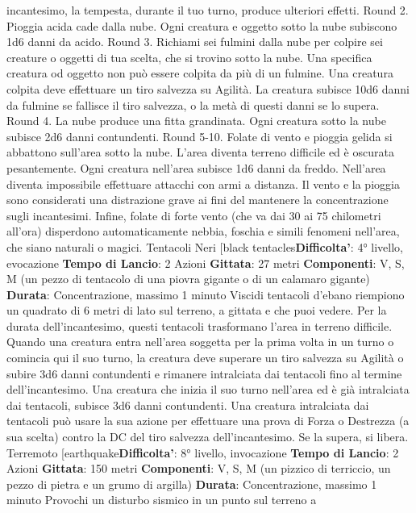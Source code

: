 \begin{multicols}{2}
incantesimo, la tempesta, durante il tuo turno, produce
ulteriori effetti.
Round 2. Pioggia acida cade dalla nube. Ogni creatura
e oggetto sotto la nube subiscono 1d6 danni da acido.
Round 3. Richiami sei fulmini dalla nube per colpire sei
creature o oggetti di tua scelta, che si trovino sotto la
nube. Una specifica creatura od oggetto non può
essere colpita da più di un fulmine. Una creatura colpita
deve effettuare un tiro salvezza su Agilità. La
creatura subisce 10d6 danni da fulmine se fallisce il tiro
salvezza, o la metà di questi danni se lo supera.
Round 4. La nube produce una fitta grandinata. Ogni
creatura sotto la nube subisce 2d6 danni contundenti.
Round 5-10. Folate di vento e pioggia gelida si
abbattono sull’area sotto la nube. L’area diventa terreno
difficile ed è oscurata pesantemente. Ogni creatura
nell’area subisce 1d6 danni da freddo. Nell’area diventa
impossibile effettuare attacchi con armi a distanza. Il
vento e la pioggia sono considerati una distrazione
grave ai fini del mantenere la concentrazione sugli
incantesimi. Infine, folate di forte vento (che va dai 30 ai
75 chilometri all’ora) disperdono automaticamente
nebbia, foschia e simili fenomeni nell’area, che siano
naturali o magici.
Tentacoli Neri
[black tentacles\textbf{Difficolta'}:
4° livello, evocazione
\textbf{Tempo di Lancio}: 2 Azioni
\textbf{Gittata}: 27 metri
\textbf{Componenti}: V, S, M (un pezzo di tentacolo di una
piovra gigante o di un calamaro gigante)
\textbf{Durata}: Concentrazione, massimo 1 minuto
Viscidi tentacoli d’ebano riempiono un quadrato di 6
metri di lato sul terreno, a gittata e che puoi vedere. Per
la durata dell’incantesimo, questi tentacoli trasformano
l’area in terreno difficile.
Quando una creatura entra nell’area soggetta per la
prima volta in un turno o comincia qui il suo turno, la
creatura deve superare un tiro salvezza su Agilità o
subire 3d6 danni contundenti e rimanere intralciata dai
tentacoli fino al termine dell’incantesimo. Una creatura
che inizia il suo turno nell’area ed è già intralciata dai
tentacoli, subisce 3d6 danni contundenti.
Una creatura intralciata dai tentacoli può usare la sua
azione per effettuare una prova di Forza o Destrezza (a
sua scelta) contro la DC del tiro salvezza
dell’incantesimo. Se la supera, si libera.
Terremoto
[earthquake\textbf{Difficolta'}:
8° livello, invocazione
\textbf{Tempo di Lancio}: 2 Azioni
\textbf{Gittata}: 150 metri
\textbf{Componenti}: V, S, M (un pizzico di terriccio, un pezzo
di pietra e un grumo di argilla)
\textbf{Durata}: Concentrazione, massimo 1 minuto
Provochi un disturbo sismico in un punto sul terreno a

\end{multicols}
